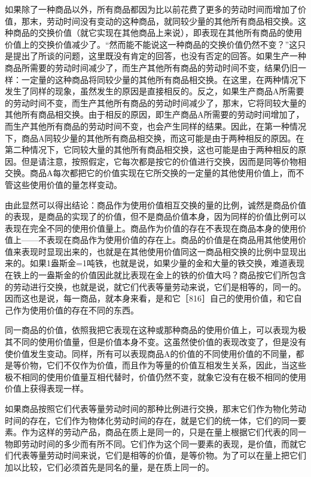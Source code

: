 如果除了一种商品以外，所有商品都因为比以前花费了更多的劳动时间而增加了价值，那末，劳动时间没有变动的这种商品，就同较少量的其他所有商品相交换。这种商品的交换价值（就它实现在其他商品上来说），即表现在其他所有商品的使用价值上的交换价值减少了。“然而能不能说这一种商品的交换价值仍然不变？”这只是提出了所谈的问题，这里既没有肯定的回答，也没有否定的回答。如果生产一种商品所需要的劳动时间减少了，而生产其他所有商品的劳动时间不变，结果仍旧一样：一定量的这种商品将同较少量的其他所有商品相交换。在这里，在两种情况下发生了同样的现象，虽然发生的原因是直接相反的。反之，如果生产商品A所需要的劳动时间不变，而生产其他所有商品的劳动时间减少了，那末，它将同较大量的其他所有商品相交换。由于相反的原因，即生产商品A所需要的劳动时间增加了，而生产其他所有商品的劳动时间不变，也会产生同样的结果。因此，在第一种情况下，商品A同较少量的其他所有商品相交换，而这可能是由于两种相反的原因。在第二种情况下，它同较大量的其他所有商品相交换，这也可能是由于两种相反的原因。但是请注意，按照假定，它每次都是按它的价值进行交换，因而是同等价物相交换。商品A每次都把它的价值实现在它所交换的一定量的其他使用价值上，而不管这些使用价值的量怎样变动。

由此显然可以得出结论：商品作为使用价值相互交换的量的比例，诚然是商品价值的表现，是商品的实现了的价值，但不是商品价值本身，因为同样的价值比例可以表现在完全不同的使用价值量上。商品作为价值的存在不表现在商品本身的使用价值上——不表现在商品作为使用价值的存在上。商品的价值是在商品用其他使用价值来表现时显现出来的，也就是在其他使用价值同这一商品相交换的比例中显现出来的。如果1盎斯金=1吨铁，也就是说，如果少量的金和大量的铁交换，难道表现在铁上的一盎斯金的价值因此就比表现在金上的铁的价值大吗？商品按它们所包含的劳动进行交换，也就是说，就它们代表等量劳动来说，它们是相等的，同一的。因而这也是说，每一商品，就本身来看，是和它［816］自己的使用价值，和它自己作为使用价值的存在不同的东西。

同一商品的价值，依照我把它表现在这种或那种商品的使用价值上，可以表现为极其不同的使用价值量，但是价值本身不变。这虽然使价值的表现改变了，但是没有使价值发生变动。同样，所有可以表现商品A的价值的不同使用价值的不同量，都是等价物，它们不仅作为价值，而且作为等量的价值互相发生关系，因此，当这些极不相同的使用价值量互相代替时，价值仍然不变，就象它没有在极不相同的使用价值上获得表现一样。

如果商品按照它们代表等量劳动时间的那种比例进行交换，那末它们作为物化劳动时间的存在，它们作为物体化劳动时间的存在，就是它们的统一体，它们的同一要素。作为这样的劳动产品，商品在质上是同一的，只是在量上根据它们代表的同一物即劳动时间的多少而有所不同。它们作为这个同一要素的表现，是价值，而就它们代表等量劳动时间来说，它们是相等的价值，是等价物。为了可以在量上把它们加以比较，它们必须首先是同名的量，是在质上同一的。

